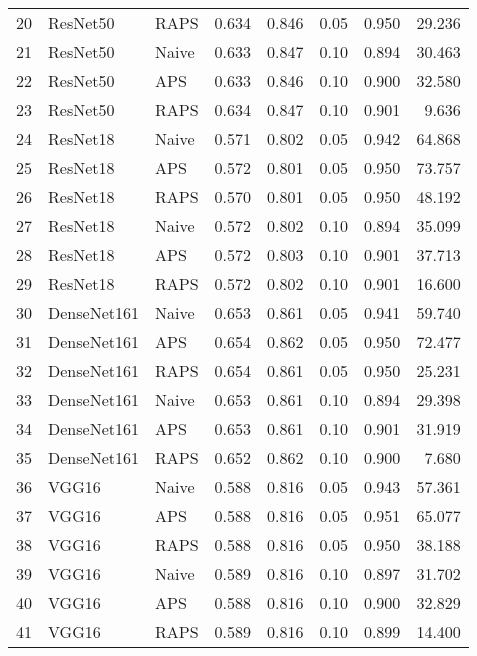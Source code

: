 \begin{tabular}{lllrrrrr}
20 &     ResNet50 &      RAPS &  0.634 &  0.846 &   0.05 &     0.950 &   29.236 \\
21 &     ResNet50 &     Naive &  0.633 &  0.847 &   0.10 &     0.894 &   30.463 \\
22 &     ResNet50 &       APS &  0.633 &  0.846 &   0.10 &     0.900 &   32.580 \\
23 &     ResNet50 &      RAPS &  0.634 &  0.847 &   0.10 &     0.901 &    9.636 \\
24 &     ResNet18 &     Naive &  0.571 &  0.802 &   0.05 &     0.942 &   64.868 \\
25 &     ResNet18 &       APS &  0.572 &  0.801 &   0.05 &     0.950 &   73.757 \\
26 &     ResNet18 &      RAPS &  0.570 &  0.801 &   0.05 &     0.950 &   48.192 \\
27 &     ResNet18 &     Naive &  0.572 &  0.802 &   0.10 &     0.894 &   35.099 \\
28 &     ResNet18 &       APS &  0.572 &  0.803 &   0.10 &     0.901 &   37.713 \\
29 &     ResNet18 &      RAPS &  0.572 &  0.802 &   0.10 &     0.901 &   16.600 \\
30 &  DenseNet161 &     Naive &  0.653 &  0.861 &   0.05 &     0.941 &   59.740 \\
31 &  DenseNet161 &       APS &  0.654 &  0.862 &   0.05 &     0.950 &   72.477 \\
32 &  DenseNet161 &      RAPS &  0.654 &  0.861 &   0.05 &     0.950 &   25.231 \\
33 &  DenseNet161 &     Naive &  0.653 &  0.861 &   0.10 &     0.894 &   29.398 \\
34 &  DenseNet161 &       APS &  0.653 &  0.861 &   0.10 &     0.901 &   31.919 \\
35 &  DenseNet161 &      RAPS &  0.652 &  0.862 &   0.10 &     0.900 &    7.680 \\
36 &        VGG16 &     Naive &  0.588 &  0.816 &   0.05 &     0.943 &   57.361 \\
37 &        VGG16 &       APS &  0.588 &  0.816 &   0.05 &     0.951 &   65.077 \\
38 &        VGG16 &      RAPS &  0.588 &  0.816 &   0.05 &     0.950 &   38.188 \\
39 &        VGG16 &     Naive &  0.589 &  0.816 &   0.10 &     0.897 &   31.702 \\
40 &        VGG16 &       APS &  0.588 &  0.816 &   0.10 &     0.900 &   32.829 \\
41 &        VGG16 &      RAPS &  0.589 &  0.816 &   0.10 &     0.899 &   14.400 \\

\end{tabular}
